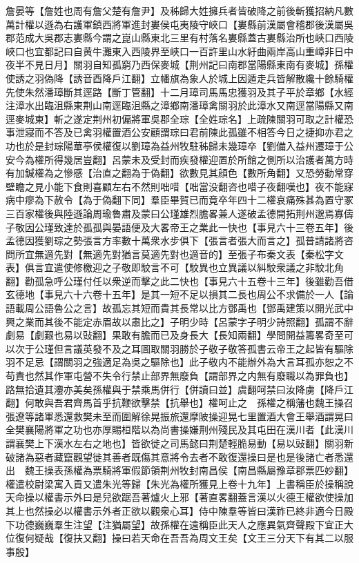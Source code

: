 詹晏等【詹姓也周有詹父楚有詹尹】及秭歸大姓擁兵者皆破降之前後斬獲招納凡數萬計權以遜為右護軍鎮西將軍進封婁侯屯夷陵守峽口【婁縣前漢屬會稽郡後漢屬吳郡范成大吳郡志婁縣今謂之崑山縣東北三里有村落名婁縣蓋古婁縣治所也峽口西陵峽口也宜都記曰自黄牛灘東入西陵界至峽口一百許里山水紆曲兩岸高山重嶂非日中夜半不見日月】關羽自知孤窮乃西保麥城【荆州記曰南郡當陽縣東南有麥城】孫權使誘之羽偽降【誘音酉降戶江翻】立幡旗為象人於城上因遁走兵皆解散纔十餘騎權先使朱然潘璋斷其逕路【斷丁管翻】十二月璋司馬馬忠獲羽及其子平於章鄉【水經注漳水出臨沮縣東荆山南逕臨沮縣之漳鄉南潘璋禽關羽於此漳水又南逕當陽縣又南逕麥城東】斬之遂定荆州初偏將軍吳郡全琮【全姓琮名】上疏陳關羽可取之計權恐事泄寢而不答及已禽羽權置酒公安顧謂琮曰君前陳此孤雖不相答今日之捷抑亦君之功也於是封琮陽華亭侯權復以劉璋為益州牧駐秭歸未幾璋卒【劉備入益州遷璋于公安今為權所得幾居豈翻】呂蒙未及受封而疾發權迎置於所館之側所以治護者萬方時有加鍼權為之慘慼【治直之翻為于偽翻】欲數見其顔色【數所角翻】又恐勞動常穿壁瞻之見小能下食則喜顧左右不然則咄唶【咄當没翻咨也唶子夜翻嘆也】夜不能寐病中瘳為下赦令【為于偽翻下同】羣臣畢賀已而竟卒年四十二權哀痛殊甚為置守冢三百家權後與陸遜論周瑜魯肅及蒙曰公瑾雄烈膽畧兼人遂破孟德開拓荆州邈焉寡儔子敬因公瑾致達於孤孤與晏語便及大畧帝王之業此一快也【事見六十三卷五年】後孟德因獲劉琮之勢張言方率數十萬衆水步俱下【張言者張大而言之】孤普請諸將咨問所宜無適先對【無適先對猶言莫適先對也適音的】至張子布秦文表【秦松字文表】俱言宜遣使修檄迎之子敬即駮言不可【駮異也立異議以糾駮衆議之非駮北角翻】勸孤急呼公瑾付任以衆逆而擊之此二快也【事見六十五卷十三年】後雖勸吾借玄德地【事見六十六卷十五年】是其一短不足以損其二長也周公不求備於一人【論語載周公語魯公之言】故孤忘其短而貴其長常以比方鄧禹也【鄧禹建策以開光武中興之業而其後不能定赤眉故以肅比之】子明少時【呂蒙字子明少詩照翻】孤謂不辭劇易【劇艱也易以䜴翻】果敢有膽而已及身長大【長知兩翻】學問開益籌畧奇至可以次于公瑾但言議英發不及之耳圖取關羽勝於子敬子敬答孤書云帝王之起皆有驅除羽不足忌【謂關羽之強適足為吳之驅除也】此子敬内不能辦外為大言耳孤亦恕之不苟責也然其作軍屯營不失令行禁止部界無廢負【謂部界之内無有廢職以為罪負也】路無拾遺其灋亦美矣孫權與于禁乘馬併行【併讀曰並】虞翻呵禁曰汝降虜【降戶江翻】何敢與吾君齊馬首乎抗鞭欲擊禁【抗舉也】權呵止之　孫權之稱藩也魏王操召張遼等諸軍悉還救樊未至而圍解徐晃振旅還摩陂操迎晃七里置酒大會王舉酒謂晃曰全樊襄陽將軍之功也亦厚賜桓階以為尚書操嫌荆州殘民及其屯田在漢川者【此漢川謂襄樊上下漢水左右之地也】皆欲徙之司馬懿曰荆楚輕脆易動【易以䜴翻】關羽新破諸為惡者藏竄觀望徙其善者既傷其意將令去者不敢復還操曰是也是後諸亡者悉還出　魏王操表孫權為票騎將軍假節領荆州牧封南昌侯【南昌縣屬豫章郡票匹妙翻】權遣校尉梁寓入貢又遣朱光等歸【朱光為權所獲見上卷十九年】上書稱臣於操稱說天命操以權書示外曰是兒欲踞吾著爐火上邪【著直畧翻蓋言漢以火德王權欲使操加其上也然操必以權書示外者正欲以觀衆心耳】侍中陳羣等皆曰漢祚已終非適今日殿下功德巍巍羣生注望【注猶屬望】故孫權在遠稱臣此天人之應異氣齊聲殿下宜正大位復何疑哉【復扶又翻】操曰若天命在吾吾為周文王矣【文王三分天下有其二以服事殷】

